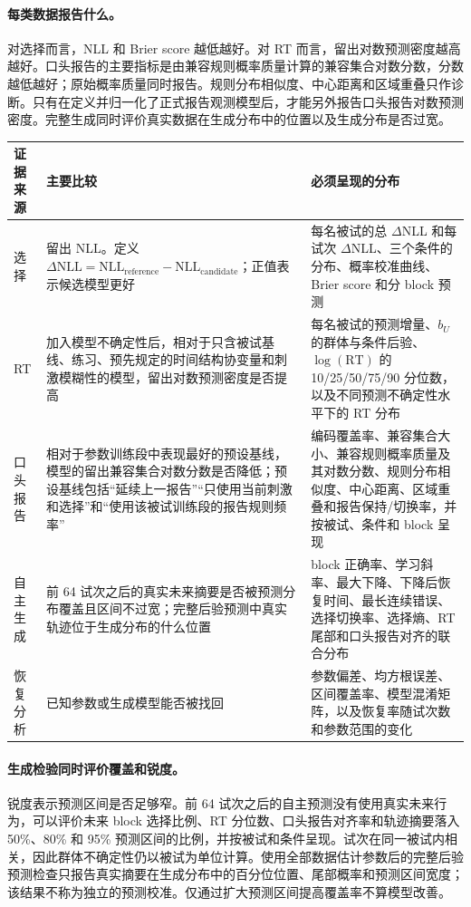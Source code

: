 \paragraph{每类数据报告什么。}
对选择而言，NLL 和 Brier score 越低越好。对 RT 而言，留出对数预测密度越高越好。口头报告的主要指标是由兼容规则概率质量计算的兼容集合对数分数，分数越低越好；原始概率质量同时报告。规则分布相似度、中心距离和区域重叠只作诊断。只有在定义并归一化了正式报告观测模型后，才能另外报告口头报告对数预测密度。完整生成同时评价真实数据在生成分布中的位置以及生成分布是否过宽。
\begin{center}
\small
\begin{tabular}{p{}|p{}|p{}}
\hline
证据来源 & 主要比较 & 必须呈现的分布\\
\hline
选择
& 留出 NLL。定义 $\Delta\mathrm{NLL}=\mathrm{NLL}_{\mathrm{reference}}-\mathrm{NLL}_{\mathrm{candidate}}$；正值表示候选模型更好
& 每名被试的总 $\Delta$NLL 和每试次 $\Delta$NLL、三个条件的分布、概率校准曲线、Brier score 和分 block 预测\\
\hline
RT
& 加入模型不确定性后，相对于只含被试基线、练习、预先规定的时间结构协变量和刺激模糊性的模型，留出对数预测密度是否提高
& 每名被试的预测增量、$b_U$ 的群体与条件后验、$\log(\mathrm{RT})$ 的 10/25/50/75/90 分位数，以及不同预测不确定性水平下的 RT 分布\\
\hline
口头报告
& 相对于参数训练段中表现最好的预设基线，模型的留出兼容集合对数分数是否降低；预设基线包括“延续上一报告”“只使用当前刺激和选择”和“使用该被试训练段的报告规则频率”
& 编码覆盖率、兼容集合大小、兼容规则概率质量及其对数分数、规则分布相似度、中心距离、区域重叠和报告保持/切换率，并按被试、条件和 block 呈现\\
\hline
自主生成
& 前 64 试次之后的真实未来摘要是否被预测分布覆盖且区间不过宽；完整后验预测中真实轨迹位于生成分布的什么位置
& block 正确率、学习斜率、最大下降、下降后恢复时间、最长连续错误、选择切换率、选择熵、RT 尾部和口头报告对齐的联合分布\\
\hline
恢复分析
& 已知参数或生成模型能否被找回
& 参数偏差、均方根误差、区间覆盖率、模型混淆矩阵，以及恢复率随试次数和参数范围的变化\\
\hline
\end{tabular}
\normalsize
\end{center}

\paragraph{生成检验同时评价覆盖和锐度。}
锐度表示预测区间是否足够窄。前 64 试次之后的自主预测没有使用真实未来行为，可以评价未来 block 选择比例、RT 分位数、口头报告对齐率和轨迹摘要落入 50\%、80\% 和 95\% 预测区间的比例，并按被试和条件呈现。试次在同一被试内相关，因此群体不确定性仍以被试为单位计算。使用全部数据估计参数后的完整后验预测检查只报告真实摘要在生成分布中的百分位位置、尾部概率和预测区间宽度；该结果不称为独立的预测校准。仅通过扩大预测区间提高覆盖率不算模型改善。

